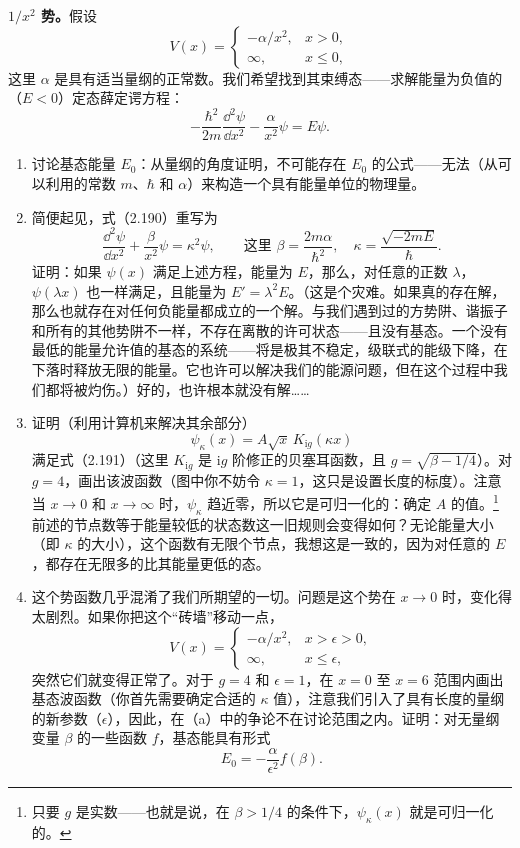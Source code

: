 \begingroup\small
\setlength{\abovedisplayskip}{5pt}
\setlength{\belowdisplayskip}{5pt}
\textbf{$1/x^2$ 势。}假设
\[
V(x)=\begin{cases}-\alpha/x^2,&x>0,\\\infty,&x\leq0,\end{cases}
\]
这里 $\alpha$ 是具有适当量纲的正常数。我们希望找到其束缚态——求解能量为负值的（$E<0$）定态薛定谔方程：
\[
-\frac{\hbar^2}{2m}\frac{\dd^2\psi}{\dd x^2}-\frac{\alpha}{x^2}\psi=E\psi.
\]
\begin{enumerate}
\item 讨论基态能量 $E_0$：从量纲的角度证明，不可能存在 $E_0$ 的公式——无法（从可以利用的常数 $m$、$\hbar$ 和 $\alpha$）来构造一个具有能量单位的物理量。
\item 简便起见，式（2.190）重写为
\[
\frac{\dd^2\psi}{\dd x^2}+\frac{\beta}{x^2}\psi=\kappa^2\psi,
\qquad\text{这里 }\beta=\frac{2m\alpha}{\hbar^2},\quad
\kappa=\frac{\sqrt{-2mE}}{\hbar}.
\]
证明：如果 $\psi(x)$ 满足上述方程，能量为 $E$，那么，对任意的正数 $\lambda$，$\psi(\lambda x)$ 也一样满足，且能量为 $E'=\lambda^2E$。（这是个灾难。如果真的存在解，那么也就存在对任何负能量都成立的一个解。与我们遇到过的方势阱、谐振子和所有的其他势阱不一样，不存在离散的许可状态——且没有基态。一个没有最低的能量允许值的基态的系统——将是极其不稳定，级联式的能级下降，在下落时释放无限的能量。它也许可以解决我们的能源问题，但在这个过程中我们都将被灼伤。）好的，也许根本就没有解……
\item 证明（利用计算机来解决其余部分）
\[
\psi_\kappa(x)=A\sqrt{x}\,K_{\mathrm{i}g}(\kappa x)
\]
满足式（2.191）（这里 $K_{\mathrm{i}g}$ 是 $\mathrm{i}g$ 阶修正的贝塞耳函数，且 $g=\sqrt{\beta-1/4}$）。对 $g=4$，画出该波函数（图中你不妨令 $\kappa=1$，这只是设置长度的标度）。注意当 $x\to0$ 和 $x\to\infty$ 时，$\psi_\kappa$ 趋近零，所以它是可归一化的：确定 $A$ 的值。\footnote{只要 $g$ 是实数——也就是说，在 $\beta>1/4$ 的条件下，$\psi_\kappa(x)$ 就是可归一化的。}前述的节点数等于能量较低的状态数这一旧规则会变得如何？无论能量大小（即 $\kappa$ 的大小），这个函数有无限个节点，我想这是一致的，因为对任意的 $E$，都存在无限多的比其能量更低的态。
\item 这个势函数几乎混淆了我们所期望的一切。问题是这个势在 $x\to0$ 时，变化得太剧烈。如果你把这个“砖墙”移动一点，
\[
V(x)=\begin{cases}-\alpha/x^2,&x>\epsilon>0,\\\infty,&x\leq\epsilon,\end{cases}
\]
突然它们就变得正常了。对于 $g=4$ 和 $\epsilon=1$，在 $x=0$ 至 $x=6$ 范围内画出基态波函数（你首先需要确定合适的 $\kappa$ 值），注意我们引入了具有长度的量纲的新参数（$\epsilon$），因此，在（a）中的争论不在讨论范围之内。证明：对无量纲变量 $\beta$ 的一些函数 $f$，基态能具有形式
\[
E_0=-\frac{\alpha}{\epsilon^2}f(\beta).
\]
\end{enumerate}
\endgroup
\vfill

